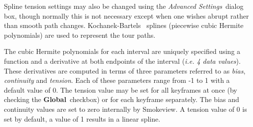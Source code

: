 \documentclass[11pt,twoside]{book}
\begin{document}
Spline tension settings may also be changed using the {\em
Advanced Settings}\ dialog box, though normally this is not
necessary except when one wishes abrupt rather than smooth path
changes. Kochanek-Bartels~\cite{Moller:02} splines (piecewise cubic
Hermite polynomials) are used to represent the tour paths.

The cubic Hermite polynomials for each interval are uniquely
specified using a function and a derivative at both endpoints of
the interval ({\em i.e. 4 data values}).  These derivatives are
computed in terms of three parameters referred to as {\em bias},
{\em continuity} and {\em tension}. Each of these parameters range
from -1 to 1 with a default value of 0. The tension value may be
set for all keyframes at once (by checking the {\bf Global}\
checkbox) or for each keyframe separately.  The bias and
continuity values are set to zero internally by Smokeview.  A
tension value of 0 is set by default, a value of 1 results in a
linear spline.
\end{document}
